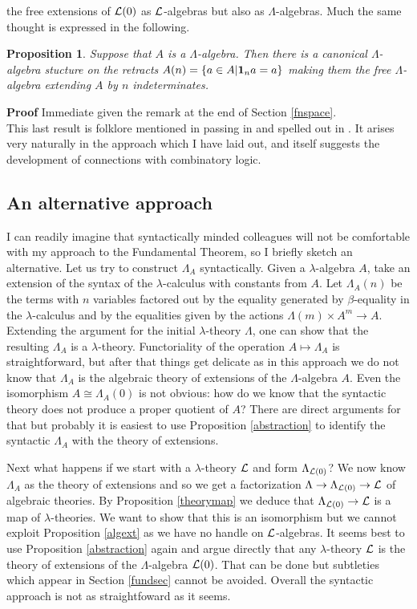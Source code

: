 \documentclass[12pt, amstex, amssymb]{article}
\newtheorem{proposition}[theorem]{Proposition}
\newcommand{\mcat}{\cal}
\newcommand{\app}{{\bf 1}}
\begin{document}
the free extensions of ${\mcat L}(0)$ as
$\mcat L$-algebras but also as $\Lambda$-algebras.
Much the same thought is expressed in the following.
\begin{proposition} Suppose that $A$ is a $\Lambda$-algebra.
Then there is a canonical $\Lambda$-algebra stucture on the
retracts $A(n) = \{ a \in A | \app_n a = a \}$ 
making them the free $\Lambda$-algebra
extending $A$ by $n$ indeterminates.
\end{proposition}
{\bf Proof} Immediate given the remark 
at the end of Section \ref{fnspace}.\\[0.3em]
This last result is folklore mentioned in
passing in \cite{Freyd89}
and spelled out in \cite{Sel02}. It arises very naturally 
in the approach which I have laid out, and itself suggests
the development of connections with combinatory logic. 

\subsection{An alternative approach}

I can readily imagine that syntactically minded 
colleagues will not be 
comfortable with my approach to the Fundamental
Theorem, so I briefly sketch an alternative.
Let us try to construct $\Lambda_A$
syntactically. Given a $\lambda$-algebra $A$, take 
an extension of the syntax of the $\lambda$-calculus
with constants from $A$. Let $\Lambda_A(n)$ be the terms
with $n$ variables factored out by the equality generated
by $\beta$-equality in the $\lambda$-calculus and by
the equalities given by the actions $\Lambda(m) \times A^m \to A$.
Extending the argument for the initial
$\lambda$-theory $\Lambda$, one can show that the 
resulting $\Lambda_A$ is a $\lambda$-theory. Functoriality of the operation
$A \mapsto \Lambda_A$ is straightforward, but after that
things get delicate as in this approach we do not know that
$\Lambda_A$ is the algebraic theory of extensions of the $\Lambda$-algebra $A$.
Even the isomorphism $A \cong \Lambda_A(0)$ is not obvious:
how do we know that the syntactic theory does not produce
a proper quotient of $A$? There are direct arguments for that
but probably it is easiest to use Proposition \ref{abstraction}
to identify the syntactic $\Lambda_A$ with the theory of extensions.

Next what happens if we start with a $\lambda$-theory $\mcat L$
and form $\Lambda_{{\mcat L}(0)}$? We now know $\Lambda_A$ as
the theory of extensions and so we get a factorization
$\Lambda \to \Lambda_{{\mcat L}(0)} \to {\mcat L}$ of algebraic
theories. By Proposition \ref{theorymap} we deduce that 
$\Lambda_{{\mcat L}(0)} \to {\mcat L}$ is a map of 
$\lambda$-theories. We want to show that this is an
isomorphism but we cannot exploit 
Proposition \ref{algext} as we have no handle on
$\mcat L$-algebras. It seems best to use Proposition \ref{abstraction}
again and argue directly that any $\lambda$-theory $\mcat L$ is the theory
of extensions of the $\Lambda$-algebra ${\mcat L}(0)$. That can be done
but subtleties which appear in Section \ref{fundsec} cannot be
avoided. Overall the syntactic approach is not as straightfoward
as it seems.
\end{document}
